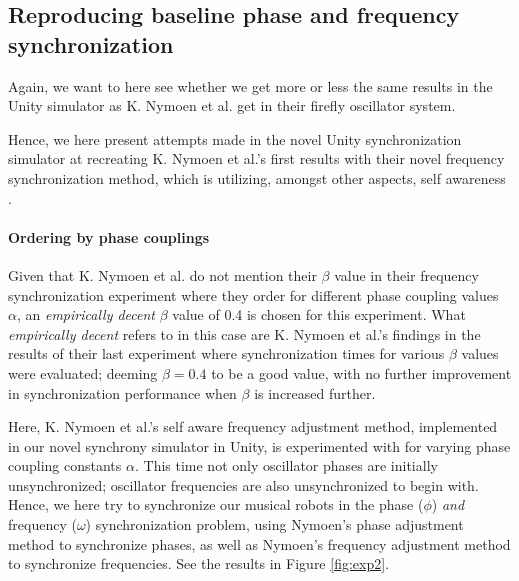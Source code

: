 	\subsection{Reproducing baseline phase and frequency synchronization}
	Again, we want to here see whether we get more or less the same results in the Unity simulator as K. Nymoen et al. get in their firefly oscillator system.
	
	Hence, we here present attempts made in the novel Unity synchronization simulator at recreating K. Nymoen et al.'s first results with their novel frequency synchronization method, which is utilizing, amongst other aspects, self awareness \cite{nymoen_synch}.
	
		\paragraph{Ordering by phase couplings}
		
		Given that K. Nymoen et al. do not mention their $\beta$ value in their frequency synchronization experiment where they order for different phase coupling values $\alpha$, an \textit{empirically decent} $\beta$ value of 0.4 is chosen for this experiment. What \textit{empirically decent} refers to in this case are K. Nymoen et al.'s findings in the results of their last experiment \cite{nymoen_synch} where synchronization times for various $\beta$ values were evaluated; deeming $\beta=0.4$ to be a good value, with no further improvement in synchronization performance when $\beta$ is increased further.
		
		Here, K. Nymoen et al.'s self aware frequency adjustment method, implemented in our novel synchrony simulator in Unity, is experimented with for varying phase coupling constants $\alpha$. This time not only oscillator phases are initially unsynchronized; oscillator frequencies are also unsynchronized to begin with. Hence, we here try to synchronize our musical robots in the phase ($\phi$) \textit{and} frequency ($\omega$) synchronization problem, using Nymoen's phase adjustment method to synchronize phases, as well as Nymoen's frequency adjustment method to synchronize frequencies. See the results in Figure \ref{fig:exp2}.
		
